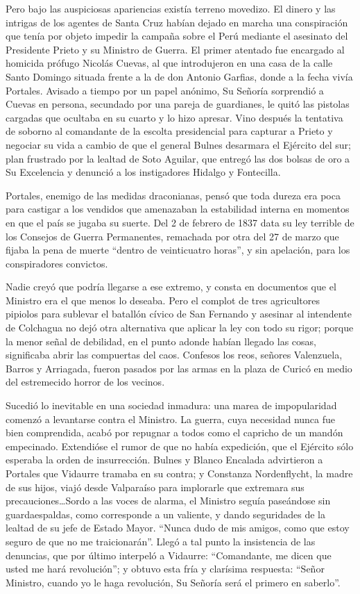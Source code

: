 \documentclass[10pt,twoside,openright]{memoir}
\begin{document}
Pero bajo las auspiciosas apariencias existía terreno movedizo. El
dinero y las intrigas de los agentes de Santa Cruz habían dejado en
marcha una conspiración que tenía por objeto impedir la campaña sobre el
Perú mediante el asesinato del Presidente Prieto y su Ministro de
Guerra. El primer atentado fue encargado al homicida prófugo Nicolás
Cuevas, al que introdujeron en una casa de la calle Santo Domingo
situada frente a la de don Antonio Garfias, donde a la fecha vivía
Portales. Avisado a tiempo por un papel anónimo, Su Señoría sorprendió a
Cuevas en persona, secundado por una pareja de guardianes, le quitó las
pistolas cargadas que ocultaba en su cuarto y lo hizo apresar. Vino
después la tentativa de soborno al comandante de la escolta presidencial
para capturar a Prieto y negociar su vida a cambio de que el general
Bulnes desarmara el Ejército del sur; plan frustrado por la lealtad de
Soto Aguilar, que entregó las dos bolsas de oro a Su Excelencia y
denunció a los instigadores Hidalgo y Fontecilla.

Portales, enemigo de las medidas draconianas, pensó que toda dureza era
poca para castigar a los vendidos que amenazaban la estabilidad interna
en momentos en que el país se jugaba su suerte. Del 2 de febrero de 1837
data su ley terrible de los Consejos de Guerra Permanentes, remachada
por otra del 27 de marzo que fijaba la pena de muerte ``dentro de
veinticuatro horas'', y sin apelación, para los conspiradores convictos.

Nadie creyó que podría llegarse a ese extremo, y consta en documentos
que el Ministro era el que menos lo deseaba. Pero el complot de tres
agricultores pipiolos para sublevar el batallón cívico de San Fernando y
asesinar al intendente de Colchagua no dejó otra alternativa que aplicar
la ley con todo su rigor; porque la menor señal de debilidad, en el
punto adonde habían llegado las cosas, significaba abrir las compuertas
del caos. Confesos los reos, señores Valenzuela, Barros y Arriagada,
fueron pasados por las armas en la plaza de Curicó en medio del
estremecido horror de los vecinos.

Sucedió lo inevitable en una sociedad inmadura: una marea de
impopularidad comenzó a levantarse contra el Ministro. La guerra, cuya
necesidad nunca fue bien comprendida, acabó por repugnar a todos como el
capricho de un mandón empecinado. Extendióse el rumor de que no había
expedición, que el Ejército sólo esperaba la orden de insurrección.
Bulnes y Blanco Encalada advirtieron a Portales que Vidaurre tramaba en
su contra; y Constanza Nordenflycht, la madre de sus hijos, viajó desde
Valparaíso para implorarle que extremara sus precauciones\ldots Sordo a las
voces de alarma, el Ministro seguía paseándose sin guardaespaldas, como
corresponde a un valiente, y dando seguridades de la lealtad de su jefe
de Estado Mayor. ``Nunca dudo de mis amigos, como que estoy seguro de que
no me traicionarán''. Llegó a tal punto la insistencia de las denuncias,
que por último interpeló a Vidaurre: ``Comandante, me dicen que usted me
hará revolución''; y obtuvo esta fría y clarísima respuesta: ``Señor
Ministro, cuando yo le haga revolución, Su Señoría será el primero en
saberlo''.
\end{document}

